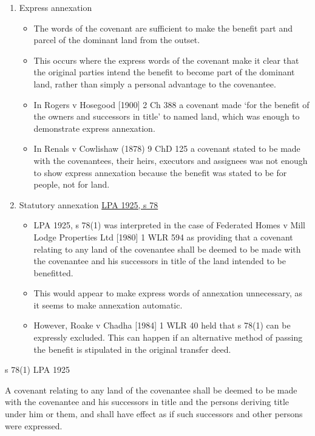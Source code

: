 \documentclass[
]{article}
\providecommand{\tightlist}{%
  \setlength{\itemsep}{0pt}\setlength{\parskip}{0pt}}
\newenvironment{env-9843ce55-0506-497d-95ba-03a690b05b3c}
{
    \savenotes\tcolorbox[blanker,breakable,left=5pt,borderline west={2pt}{-4pt}{green}]
}
{
    \endtcolorbox\spewnotes
}
\begin{document}
\begin{enumerate}
\item
  Express annexation

  \begin{itemize}
  \tightlist
  \item
    The words of the covenant are sufficient to make the benefit part
    and parcel of the dominant land from the outset.
  \item
    This occurs where the express words of the covenant make it clear
    that the original parties intend the benefit to become part of the
    dominant land, rather than simply a personal advantage to the
    covenantee.
  \item
    In Rogers v Hosegood {[}1900{]} 2 Ch 388 a covenant made `for the
    benefit of the owners and successors in title' to named land, which
    was enough to demonstrate express annexation.
  \item
    In Renals v Cowlishaw (1878) 9 ChD 125 a covenant stated to be made
    with the covenantees, their heirs, executors and assignees was not
    enough to show express annexation because the benefit was stated to
    be for people, not for land.
  \end{itemize}
\item
  Statutory annexation
  \href{https://www.legislation.gov.uk/ukpga/Geo5/15-16/20/section/78}{LPA
  1925, s 78}

  \begin{itemize}
  \tightlist
  \item
    LPA 1925, s 78(1) was interpreted in the case of Federated Homes v
    Mill Lodge Properties Ltd {[}1980{]} 1 WLR 594 as providing that a
    covenant relating to any land of the covenantee shall be deemed to
    be made with the covenantee and his successors in title of the land
    intended to be benefitted.
  \item
    This would appear to make express words of annexation unnecessary,
    as it seems to make annexation automatic.
  \item
    However, Roake v Chadha {[}1984{]} 1 WLR 40 held that s 78(1) can be
    expressly excluded. This can happen if an alternative method of
    passing the benefit is stipulated in the original transfer deed.
  \end{itemize}
\end{enumerate}

\begin{env-9843ce55-0506-497d-95ba-03a690b05b3c}

s 78(1) LPA 1925

A covenant relating to any land of the covenantee shall be deemed to be
made with the covenantee and his successors in title and the persons
deriving title under him or them, and shall have effect as if such
successors and other persons were expressed.

\end{env-9843ce55-0506-497d-95ba-03a690b05b3c}
\end{document}
